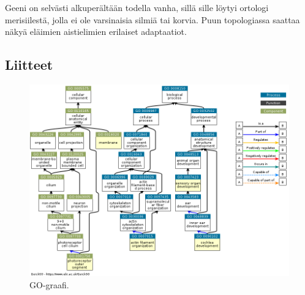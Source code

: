 \documentclass[a4paper,11pt,notitlepage]{article}
\begin{document}
Geeni on selvästi alkuperältään todella vanha, sillä sille löytyi ortologi merisiilestä, jolla ei ole varsinaisia silmiä tai korvia. Puun topologiassa saattaa näkyä eläimien aistielimien erilaiset adaptaatiot.

\pagebreak
\printbibliography[title={Kirjallisuusluettelo}]

\pagebreak
\renewcommand{\thefigure}{A\arabic{figure}}
\setcounter{figure}{0}
\begin{appendices}
\renewcommand\thefigure{\thesection.\arabic{figure}} 
\section{Liitteet}

\begin{figure}[!h]
	\centering
	\includegraphics[width=\textwidth]{gochart.png}
	\caption{GO-graafi.} \label{gograafi}
\end{figure}


\end{appendices}
\end{document}
